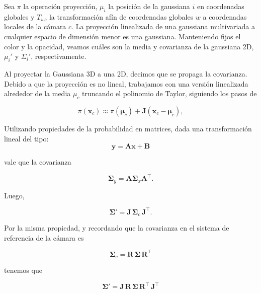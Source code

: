 Sea $\pi$ la operación proyección, $\mu_i$ la posición de la gaussiana $i$ en coordenadas globales y $T_{wc}$ la transformación afín de coordenadas globales $w$ a coordenadas locales de la cámara $c$.
La proyección linealizada de una gaussiana multivariada a cualquier espacio de dimensión menor es una gaussiana. Manteniendo fijos el color y la opacidad, veamos cuáles son la media y covarianza de la gaussiana 2D, $\mu_i'$ y $\Sigma_i'$, respectivamente.

Al proyectar la Gaussiana 3D a una 2D, decimos que se propaga la covarianza. Debido a que la proyección es no lineal, trabajamos con una versión linealizada alrededor de la media $\mu_c$ truncando el polinomio de Taylor, siguiendo los pasos de \cite{zwicker2002ewa}

\begin{equation}
\pi(\mathbf{x}_c)
\approx
\pi(\boldsymbol{\mu}_c)
+
\mathbf{J}
\left(\mathbf{x}_c - \boldsymbol{\mu}_c\right),
\end{equation}

Utilizando propiedades de la probabilidad en matrices, dada una transformación lineal del tipo:
\begin{equation}
\mathbf{y} = \mathbf{A}\mathbf{x} + \mathbf{B}
\end{equation}

\noindent vale que la covarianza

\begin{equation}
\boldsymbol{\Sigma}_y = \mathbf{A}\boldsymbol{\Sigma}_x\mathbf{A}^\top.
\end{equation}

Luego,

\begin{equation}
\boldsymbol{\Sigma}'
=
\mathbf{J}\,\boldsymbol{\Sigma}_c\,\mathbf{J}^\top.
\end{equation}

Por la misma propiedad, y recordando que la covarianza en el sistema de referencia de la cámara es

\begin{equation}
\boldsymbol{\Sigma}_c
=
\mathbf{R}\,\boldsymbol{\Sigma}\,\mathbf{R}^\top
\end{equation}

\noindent tenemos que

\begin{equation}
\boxed{
\boldsymbol{\Sigma}'
=
\mathbf{J}\,\mathbf{R}\,\boldsymbol{\Sigma}\,\mathbf{R}^\top\,\mathbf{J}^\top
}
\end{equation}

